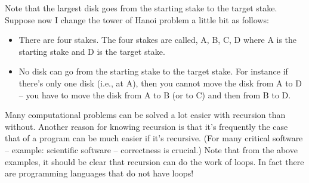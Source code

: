Note that the largest disk goes from the starting stake to the target
stake. Suppose now I change the tower of Hanoi problem a little bit as
follows:

\begin{itemize}
\item There are four stakes. The four stakes are called, A, B, C, D where A
  is the starting stake and D is the target stake.
\item No disk can go from the starting stake to the target stake. For
  instance if there's only one disk (i.e., at A), then you cannot move
  the disk from A to D -- you have to move the disk from A to B (or to
  C) and then from B to D.
\end{itemize}






Many computational problems can be solved a lot easier with recursion
than without. Another reason for knowing recursion is that
it's frequently the case that
 of a program can be
 much easier if
it's recursive. (For many critical software -- example:
scientific software -- correctness is crucial.) Note that from the above
examples, it should be clear that recursion can do the work of loops. In
fact there are programming languages that do not have loops!


